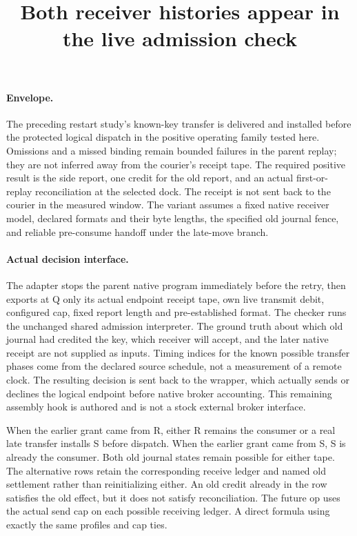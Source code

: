 \documentclass{article}
\title{Both receiver histories appear in the live admission check}
\author{}
\date{}
\begin{document}
\maketitle
\paragraph{Envelope.}
The preceding restart study's known-key transfer is delivered
and installed before the protected logical dispatch in the
positive operating family tested here. Omissions and a missed
binding remain bounded failures in the parent replay; they are
not inferred away from the courier's receipt tape.
The required positive result is the side report, one credit
for the old report, and an actual first-or-replay reconciliation
at the selected dock. The receipt is not sent back to the courier
in the measured window. The variant assumes a fixed native
receiver model, declared formats and their byte lengths, the
specified old journal fence, and reliable pre-consume handoff
under the late-move branch.

\paragraph{Actual decision interface.}
The adapter stops the parent native program immediately before
the retry, then exports at Q only its actual endpoint receipt
tape, own live transmit debit, configured cap, fixed report
length and pre-established format. The checker runs the unchanged
shared admission interpreter. The ground truth about which old
journal had credited the key, which receiver will accept, and
the later native receipt are not supplied as inputs. Timing
indices for the known possible transfer phases come from the
declared source schedule, not a measurement of a remote clock.
The resulting decision is sent back to the wrapper, which
actually sends or declines the logical endpoint before native
broker accounting. This remaining assembly hook is authored
and is not a stock external broker interface.

When the earlier grant came from R, either R remains the
consumer or a real late transfer installs S before dispatch.
When the earlier grant came from S, S is already the consumer.
Both old journal states remain possible for either tape.
The alternative rows retain the corresponding receive ledger
and named old settlement rather than reinitializing either.
An old credit already in the row satisfies the old effect,
but it does not satisfy reconciliation. The future op uses
the actual send cap on each possible receiving ledger.
A direct formula using exactly the same profiles and cap ties.
\end{document}
